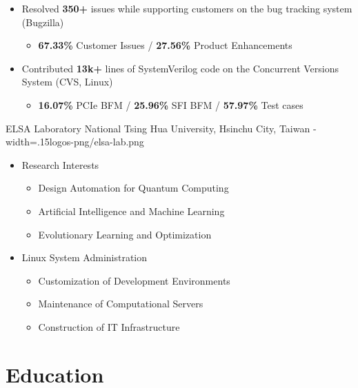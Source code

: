 \documentclass{cvclass}
\newcommand{\simplemmyy}[3]{\shortmmyyformat\formatdate{#3}{#2}{#1}}
\begin{document}
{\begin{itemize}
\begin{itemize}
        \end{itemize}
        \item Resolved \textbf{350+} issues while supporting customers on the bug tracking system (Bugzilla)
        \begin{itemize}
            \item {\textbf{67.33\%} Customer Issues / \textbf{27.56\%} Product Enhancements}
        \end{itemize}
        \item Contributed \textbf{13k+} lines of SystemVerilog code on the Concurrent Versions System (CVS, Linux)
        \begin{itemize}
            \item \textbf{16.07\%} PCIe BFM / \textbf{25.96\%} SFI BFM / \textbf{57.97\%} Test cases
        \end{itemize}
    \end{itemize}}

    {ELSA Laboratory}
    {National Tsing Hua University, Hsinchu City, Taiwan}
    {\simplemmyy{2016}{2}{15} - \simplemmyy{2021}{6}{30}}
    {width=.15\linewidth}{logos-png/elsa-lab.png}
    {\begin{itemize}
        \item Research Interests
        \begin{itemize}
            \item Design Automation for Quantum Computing  
            \item Artificial Intelligence and Machine Learning
            \item Evolutionary Learning and Optimization
        \end{itemize}
        \item Linux System Administration
        \begin{itemize}
            \item Customization of Development Environments
            \item Maintenance of Computational Servers
            \item Construction of IT Infrastructure
        \end{itemize}
    \end{itemize}}


\section{Education}
\end{document}
